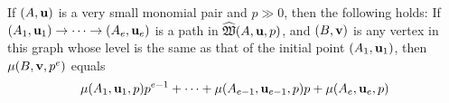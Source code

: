\documentclass[11pt]{amsart}
\begin{document}


\begin{theorem}\label{thm: higher mu formula for paths}
If $(A, \mathbf{u})$ is a very small monomial pair and $p \gg 0$, then the following holds\textup:  If 
$(A_1, \mathbf{u}_1) \to \cdots \to (A_e, \mathbf{u}_e)$ is a path in $\widehat{\mathfrak{W}}(A, \mathbf{u}, p)$, and $(B, \mathbf{v})$ is any vertex in this graph whose level is the same as that of the initial point $(A_1, \mathbf{u}_1)$, then $\mu(B, \mathbf{v}, p^e)$ equals 
%
 \[     \mu(A_1,\mathbf{u}_1,p)p^{e-1} + \cdots + \mu(A_{e-1},\mathbf{u}_{e-1},p)p + \mu(A_e,\mathbf{u}_e,p)
\]
\end{theorem}
\end{document}
